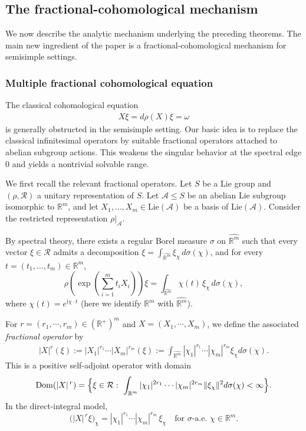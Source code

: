 \documentclass[11 pt]{amsart}
\newcommand{\RR}{\mathbb{R}}
\theoremstyle{definition}
\numberwithin{equation}{section}
\def\Lie{\mathrm{Lie}}
\begin{document}
\subsection{The fractional-cohomological mechanism} We now describe the analytic mechanism underlying the preceding theorems. The main new ingredient of the paper is a fractional-cohomological mechanism for semisimple settings.





\subsubsection{Multiple fractional cohomological equation}\label{sec:13}

 The classical cohomological equation
\begin{align}\label{for:10}
X\xi=d\rho(X)\xi=\omega
\end{align}
is generally obstructed in the semisimple setting. Our basic idea is to replace the classical infinitesimal operators by suitable fractional operators attached to abelian subgroup actions. This weakens the singular behavior at the spectral edge \(0\) and yields a nontrivial solvable range.



We first recall the relevant fractional operators. Let $S$ be a Lie group and $(\rho,\mathcal R)$ a unitary representation of $S$. Let $\mathcal A\le S$ be an abelian Lie subgroup isomorphic to $\RR^m$, and let $X_1,\dots,X_m\in \Lie(\mathcal A)$ be a basis of $\Lie(\mathcal A)$. Consider the restricted representation $\rho|_{\mathcal A}$.

By spectral theory, there exists a regular Borel measure \(\sigma\) on \(\widehat{\RR^m}\) such that every vector \(\xi\in\mathcal{R}\)
admits a decomposition $\xi=\int_{\widehat{\RR^m}}\xi_\chi\,d\sigma(\chi)$, and for every \(t=(t_1,\dots,t_m)\in\RR^m\),
\[
\rho(\exp(\sum_{i=1}^m t_iX_i))\xi=\int_{\widehat{\RR^m}}\chi(t)\,\xi_\chi\,d\sigma(\chi),
\]
where \(\chi(t)=e^{\mathrm{i}\chi \cdot t}\) (here we identify \(\RR^m\) with \(\widehat{\RR^m}\)).



For $r=(r_1,\cdots,r_m)\in (\RR^+)^m$ and $X=(X_1,\cdots,X_m)$, we define the associated \emph{fractional operator} by
\begin{align*}
  |X|^{r}(\xi):=|X_1|^{r_1}\cdots |X_m|^{r_m}(\xi):=\int_{\widehat{\RR^m}}|\chi_1|^{r_1}\cdots |\chi_m|^{r_m}\xi_\chi d\sigma(\chi).
\end{align*}
This is a positive self-adjoint operator with domain
\[
\mathrm{Dom}(|X|^{\,r})=\Bigl\{\xi\in\mathcal R:\ \int_{\mathbb R^m} |\chi_1|^{2r_1}\cdots |\chi_m|^{2r_m}\|\xi_\chi\|^2d\sigma(\chi)<\infty\Bigr\}.
\]
In the direct-integral model,
\[
\bigl(|X|^{\,r}\xi\bigr)_\chi = |\chi_1|^{r_1}\cdots |\chi_m|^{r_m}\,\xi_\chi\quad\text{for $\sigma$-a.e.\ }\chi\in\RR^m.
\]
\end{document}
